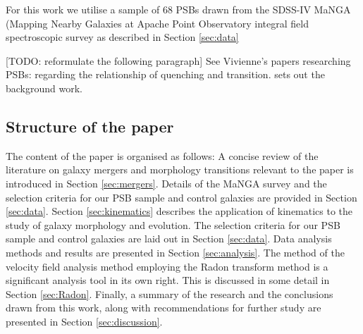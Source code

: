 For this work we utilise a sample of 68 PSBs drawn from the SDSS-IV MaNGA (Mapping Nearby Galaxies at Apache Point Observatory integral field spectroscopic survey  as described in Section \ref{sec:data}

[TODO: reformulate the following paragraph] See Vivienne's  papers researching PSBs: \citet{2017MNRAS.472.1401A} regarding the relationship of quenching and transition. \citet{2016MNRAS.463..832W} sets out the background work.


\subsection{Structure of the paper}
The content of the paper is organised as follows: A concise review of the literature on galaxy mergers and morphology transitions relevant to the paper is introduced in Section \ref{sec:mergers}. Details of the MaNGA survey and the selection criteria for our PSB sample and control galaxies are provided in Section \ref{sec:data}. Section \ref{sec:kinematics} describes the application of kinematics to the study of galaxy morphology and evolution. The selection criteria for our PSB sample and control galaxies are laid out in Section \ref{sec:data}. Data analysis methods and results are presented in Section \ref{sec:analysis}. The method of the velocity field analysis method employing the Radon transform method is a significant analysis tool in its own right. This is discussed in some detail in Section \ref{sec:Radon}. Finally, a summary of the research and the conclusions drawn from this work, along with recommendations for further study are presented in Section \ref{sec:discussion}.
